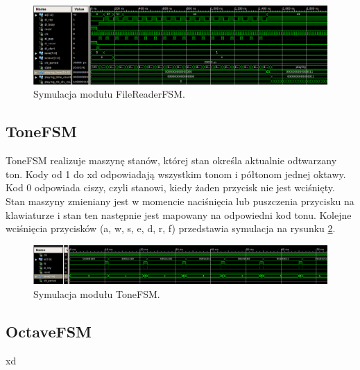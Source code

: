 \documentclass[12pt]{article}
\begin{document}
\begin{figure}[h]
  \centering
  \includegraphics[decodearray={1 0 1 0 1 0}, width=\linewidth]{images/filereader}
  \caption{Symulacja modułu FileReaderFSM.}
  \label{sim:fileReader}
\end{figure}

\subsection{ToneFSM}
ToneFSM realizuje maszynę stanów, której stan określa aktualnie odtwarzany ton.
Kody od 1 do %
xd odpowiadają wszystkim tonom i półtonom jednej oktawy. Kod 0 odpowiada ciszy, czyli stanowi, kiedy żaden przycisk nie jest wciśnięty. Stan maszyny zmieniany jest w momencie naciśnięcia lub puszczenia przycisku na klawiaturze i stan ten następnie jest mapowany na odpowiedni kod tonu. Kolejne wciśnięcia przycisków (a, w, s, e, d, r, f) przedstawia symulacja na rysunku \ref{sim:tone}.

\begin{figure}[h]
  \centering
  \includegraphics[decodearray={1 0 1 0 1 0}, width=\linewidth]{images/tone}
  \caption{Symulacja modułu ToneFSM.}
  \label{sim:tone}
\end{figure}
\subsection{OctaveFSM}
xd
\end{document}
